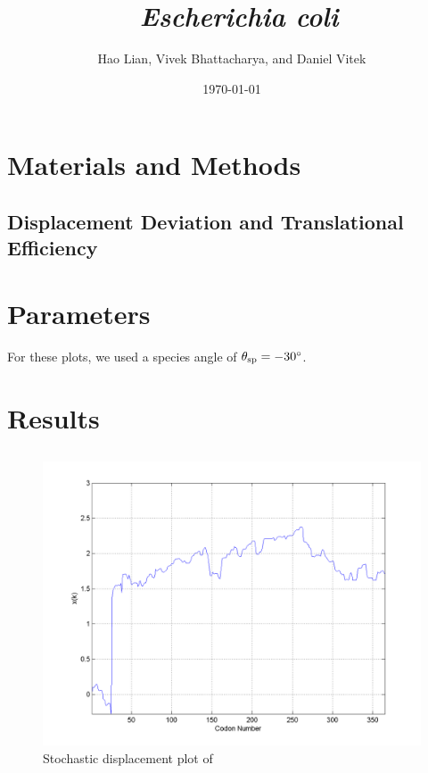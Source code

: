 \documentclass[12pt, draft]{article}
\author{{\sc Hao Lian, Vivek Bhattacharya, and Daniel Vitek}}
\date{{\sc \today}}
\title{\bf{\BWFtitle~\emph{Escherichia coli}}}
\numberwithin{equation}{section}
\begin{document}
\maketitle
\tableofcontents
\clearpage
{}

\section{Materials and Methods}
\subsection{Displacement Deviation and Translational Efficiency}


\section{Parameters}
For these plots, we used a species angle of $\theta_{\rm{sp}}
=-30^\circ$.

\section{Results}

\subsection{\prfB}

\begin{figure}
  \centering
  \caption{Stochastic displacement plot of \prfB}
  \label{prfB}
  \includegraphics[scale=0.4]{prfB/disp}
\end{figure}
\end{document}
